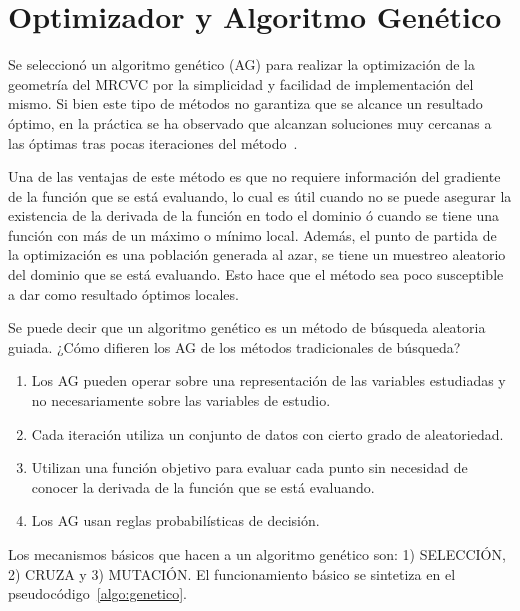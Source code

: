 \section{Optimizador y Algoritmo Genético}
%
%

Se seleccionó un algoritmo genético (AG) para realizar la optimización de la
geometría del MRCVC por la simplicidad y facilidad de implementación del mismo.
%
Si bien este tipo de métodos no garantiza que se alcance un resultado óptimo,
en la práctica se ha observado que alcanzan soluciones muy cercanas a las
óptimas tras pocas iteraciones del método~\parencite{goldberg}\parencite{shi}.

Una de las ventajas de este método es que no requiere información del gradiente
de la función que se está evaluando, lo cual es útil cuando no se puede asegurar
la existencia de la derivada de la función en todo el dominio ó cuando se tiene
una función con más de un máximo o mínimo local.
%
Además, el punto de partida de la optimización es una población generada al
azar, se tiene un muestreo aleatorio del dominio que se está evaluando.
%
Esto hace que el método sea poco susceptible a dar como resultado óptimos
locales.

Se puede decir que un algoritmo genético es un método de búsqueda aleatoria
guiada.
%
¿Cómo difieren los AG de los métodos tradicionales de búsqueda?
%
\begin{enumerate}
  \item Los AG pueden operar sobre una representación de las variables estudiadas y
no necesariamente sobre las variables de estudio.
  \item Cada iteración utiliza un conjunto de datos con cierto grado de
aleatoriedad.
  \item Utilizan una función objetivo para evaluar cada punto sin necesidad de
conocer la derivada de la función que se está evaluando.
  \item Los AG usan reglas probabilísticas de decisión.
\end{enumerate}


%
Los mecanismos básicos que hacen a un algoritmo genético son: 1) SELECCIÓN, 2) CRUZA y 3) MUTACIÓN.
%
El funcionamiento básico se sintetiza en el pseudocódigo~\ref{algo:genetico}.

